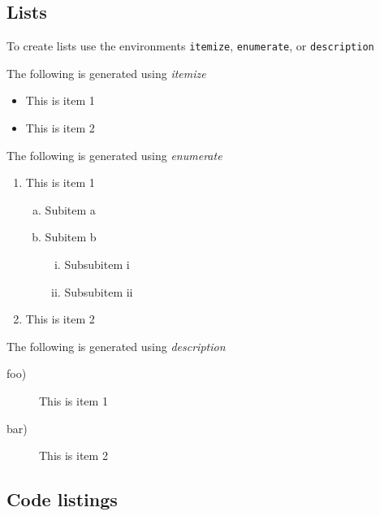 \documentclass{UoNMCHA}
\numberwithin{equation}{section}
\begin{document}
\subsection{Lists}
To create lists use the environments \verb|itemize|, \verb|enumerate|, or \verb|description|

The following is generated using \emph{itemize}
\begin{itemize}
    \item This is item 1 
    \item This is item 2
\end{itemize}
%
The following is generated using \emph{enumerate}
\begin{enumerate}[1)]
    \item This is item 1 
    \begin{enumerate}[a)]
        \item Subitem a
        \item Subitem b
        \begin{enumerate}[i)]
            \item Subsubitem i
            \item Subsubitem ii
        \end{enumerate}
    \end{enumerate}
    \item This is item 2
\end{enumerate}
%
The following is generated using \emph{description}
\begin{description}
    \item[foo)] This is item 1 
    \item[bar)] This is item 2
\end{description}

\subsection{Code listings}
\end{document}
